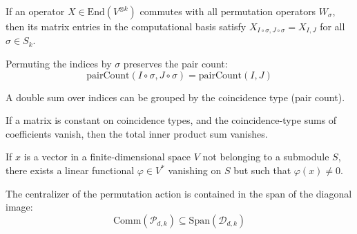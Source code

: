 \begin{lemma}\label{lem:matrix_orbit_invariant}
  \leanok
  If an operator $X \in \text{End}(V^{\otimes k})$ commutes with all permutation operators $W_\sigma$, then its matrix entries in the computational basis satisfy $X_{I \circ \sigma, J \circ \sigma} = X_{I, J}$ for all $\sigma \in S_k$.
\end{lemma}

\begin{lemma}\label{lem:pairCount_perm}
  \leanok
  Permuting the indices by $\sigma$ preserves the pair count:
  \begin{equation}
    \text{pairCount}(I \circ \sigma, J \circ \sigma) = \text{pairCount}(I, J)
  \end{equation}
\end{lemma}

\begin{lemma}\label{lem:sum_group_by_pairCount}
  \leanok
  A double sum over indices can be grouped by the coincidence type (pair count).
\end{lemma}

\begin{lemma}\label{lem:sum_vanishes_of_coeff_and_const}
  \leanok
  If a matrix is constant on coincidence types, and the coincidence-type sums of coefficients vanish, then the total inner product sum vanishes.
\end{lemma}

\begin{lemma}\label{lem:exists_functional_separation}
  \leanok
  If $x$ is a vector in a finite-dimensional space $V$ not belonging to a submodule $S$, there exists a linear functional $\varphi \in V^*$ vanishing on $S$ but such that $\varphi(x) \neq 0$.
\end{lemma}

\begin{theorem}\label{thm:centralizer_permImage_le_span_diagImage}
  \leanok
  The centralizer of the permutation action is contained in the span of the diagonal image:
  \begin{equation}
    \text{Comm}(\mathcal{P}_{d,k}) \subseteq \text{Span}(\mathcal{D}_{d,k})
  \end{equation}
\end{theorem}


